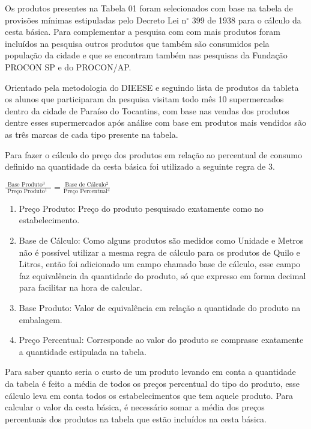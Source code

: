 \documentclass{ifto-tex}
\begin{document}
Os produtos presentes na Tabela 01 foram selecionados com base na tabela de provisões mínimas estipuladas pelo Decreto Lei n$^{\circ}$ 399 de 1938 para o cálculo da cesta básica. Para complementar a pesquisa com com mais produtos foram incluídos na pesquisa outros produtos que também são consumidos pela população da cidade e que se encontram também nas pesquisas da Fundação PROCON SP e do PROCON/AP.

Orientado pela metodologia do DIEESE e seguindo lista de produtos da tableta os alunos que participaram da pesquisa visitam todo mês 10 supermercados dentro da cidade de Paraíso do Tocantins, com base nas vendas dos produtos dentre esses supermercados após análise com base em produtos mais vendidos são as três marcas de cada tipo presente na tabela.

Para fazer o cálculo do preço dos produtos em relação ao percentual de consumo definido na quantidade da cesta básica foi utilizado a seguinte regra de 3.

\begin{center}	
$\displaystyle\frac{\mbox {Base Produto$^{3}$ }}{\mbox { Preço Produto$^{1}$ }}=\frac{\mbox {Base de Cálculo$^{2}$} }{\mbox {Preço Percentual$^{4}$}}$
\end{center}
	
	\begin{enumerate}
	\item Preço Produto: Preço do produto pesquisado exatamente como no estabelecimento.
	\item Base de Cálculo: Como alguns produtos são medidos como Unidade e Metros não é possível utilizar a mesma regra de cálculo para os produtos de Quilo e Litros, então foi adicionado um campo chamado base de cálculo, esse campo faz equivalência da quantidade do produto, só que expresso em forma decimal para facilitar na hora de calcular.
	\item Base Produto: Valor de equivalência em relação a quantidade do produto na embalagem.
	\item Preço Percentual: Corresponde ao valor do produto se comprasse exatamente a quantidade estipulada na tabela.
	
\end{enumerate}

	Para saber quanto seria o custo de um produto levando em conta a quantidade da tabela é feito a média de todos os preços percentual do tipo do produto, esse cálculo leva em conta todos os estabelecimentos que tem aquele produto. Para calcular o valor da cesta básica, é necessário somar a média dos preços percentuais dos produtos na tabela que estão incluídos na cesta básica.
	
\end{document}
